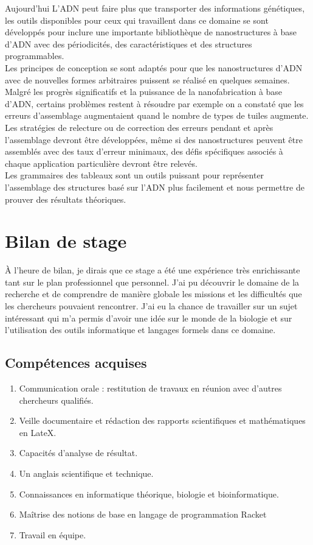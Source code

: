 \documentclass[12pt]{article}
\theoremstyle{definition}
\begin{document}
	Aujourd'hui L'ADN peut faire plus que transporter des informations génétiques, les outils disponibles pour ceux qui travaillent dans ce domaine se sont développés pour inclure une importante bibliothèque de nanostructures à base d'ADN avec des périodicités, des caractéristiques et des structures programmables.\\
	
	Les principes de conception se sont adaptés pour que les nanostructures d'ADN avec de nouvelles formes arbitraires puissent se réalisé en quelques semaines.\\
	
	Malgré les progrès significatifs et la puissance de la nanofabrication à base d'ADN, certains problèmes restent à résoudre par exemple on a constaté que les erreurs d'assemblage augmentaient quand le nombre de types de tuiles augmente.\\
	
	Les stratégies de relecture ou de correction des erreurs pendant et après l'assemblage devront être développées, même si des nanostructures peuvent être assemblés avec des taux d'erreur minimaux, des défis spécifiques associés à chaque application particulière devront être relevés.\\ 
	
	Les grammaires des tableaux sont un outils puissant pour représenter l'assemblage des structures basé sur l'ADN plus facilement et nous permettre de prouver des résultats théoriques.\\
	 \pagebreak
	 \section{Bilan de stage}
	 À l’heure de bilan, je dirais que ce stage a été une expérience très enrichissante  tant sur le plan professionnel que personnel. J’ai pu découvrir le domaine de la recherche et de comprendre de manière globale les missions et les difficultés que les chercheurs pouvaient rencontrer. J’ai eu la chance de travailler sur un sujet intéressant qui m’a permis d’avoir une idée sur le monde de la biologie et sur l’utilisation des outils informatique et langages formels dans ce domaine. 
	 \subsection{Compétences acquises}
	 \begin{enumerate}
	 	\item Communication orale : restitution de travaux en réunion avec d'autres chercheurs qualifiés.
	 	\item Veille documentaire et rédaction des rapports scientifiques et mathématiques en LateX.
	 	\item Capacités d'analyse de résultat.
	 	\item Un anglais scientifique et technique.
	 	\item Connaissances en informatique théorique, biologie et bioinformatique.
	 	\item Maîtrise des notions de base en langage de programmation Racket
	 	\item Travail en équipe.
	 \end{enumerate} 
\end{document}
